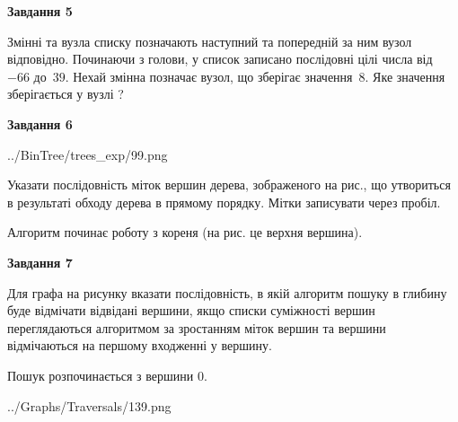 \documentclass[12pt, ukrainian]{article}
\begin{document}
{\begin {large}
{\begin {center}\textbf{Завдання 5}\end {center}}\par
Змінні  та  вузла списку позначають наступний та попередній за ним вузол відповідно. Починаючи з голови, у список записано послідовні цілі числа від~$-66$ до~$39$. Нехай змінна  позначає вузол, що зберігає значення~$8$.
Яке значення зберігається у вузлі  ?\par
\newpage

{\begin {center}\textbf{Завдання 6}\end {center}}\par

\begin{center}
	{../BinTree/trees_exp/99.png}
\end{center}
Указати послідовність міток вершин дерева, зображеного на рис., що утвориться в результаті обходу дерева в прямому порядку. Мітки записувати через пробіл.\par Алгоритм починає роботу з кореня (на рис. це верхня вершина).\par
\newpage

{\begin {center}\textbf{Завдання 7}\end {center}}\par
Для графа на рисунку вказати послідовність, в якій алгоритм пошуку в глибину буде відмічати відвідані вершини, якщо списки суміжності вершин переглядаються алгоритмом за зростанням міток вершин та вершини відмічаються на першому вход\-женні у вершину.\par
Пошук розпочинається з вершини 0.\par

\begin{center}
	{../Graphs/Traversals/139.png}
\end{center}\par
\newpage


\end{large}}
\end{document}
